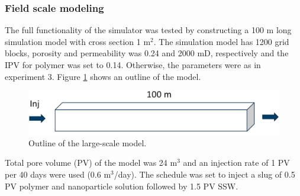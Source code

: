 \documentclass[nanomaterials,article,submit,moreauthors,pdftex]{Definitions/mdpi}
\begin{document}


\subsubsection{Field scale modeling}
The full functionality of the simulator was tested by constructing a 100 m long simulation model with cross section 1 m$^2$. The simulation model has 1200 grid blocks, porosity and permeability was 0.24 and 2000 mD, respectively and the  IPV for polymer was set to 0.14. Otherwise, the parameters were as in experiment 3. Figure \ref{fig:largeScaleModel} shows an outline of the model.
\begin{figure}[t]
    \centering
    \includegraphics[width=.5\textwidth]{fig/largeScaleModel.png}
    \caption{Outline of the large-scale model. }
    \label{fig:largeScaleModel}
\end{figure}

Total pore volume (PV) of the model was 24 m$^3$ and an injection rate of 1 PV per 40 days were used (0.6 m$^3$/day). The schedule was set to inject a slug of 0.5 PV polymer and nanoparticle solution followed by 1.5 PV SSW. 
\end{document}

